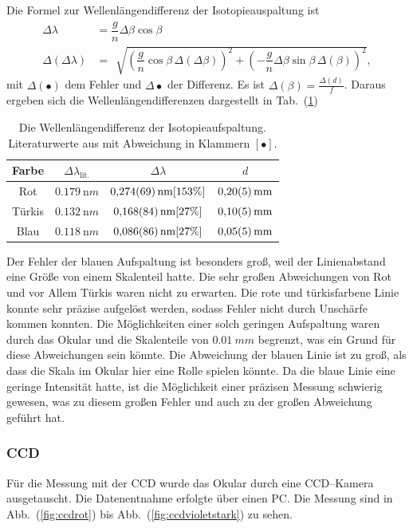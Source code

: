 \documentclass[sn-mathphys-num,iicol]{sn-jnl}
\theoremstyle{thmstyleone}
\theoremstyle{thmstyletwo}
\theoremstyle{thmstylethree}
\begin{document}
Die Formel zur Wellenlängendifferenz der Isotopieauspaltung ist
\begin{align} 
        \Delta \lambda &=\dfrac{g}{n}\Delta \beta \cos \beta\\
        \Delta \left(\Delta \lambda \right) &= \,\sqrt[]{\left(\dfrac{g}{n}\cos \beta \,\Delta \left(\Delta \beta \right)\right)^2+\left(-\dfrac{g}{n}\Delta \beta \sin \beta \,\Delta \left(\beta \right)\right)^2}
,\end{align} 
mit $\Delta \left(\bullet\right)$ dem Fehler und $\Delta \bullet $ der Differenz.
Es ist $\Delta (\beta) =\tfrac{\Delta (d)}{f}$.
Daraus ergeben sich die Wellenlängendifferenzen dargestellt in Tab.\ (\ref{tab:isotopie_okular})

\begin{table}[h]
        \begin{tabular}{cccc}
                Farbe & $\Delta \lambda _\text{lit.}$ & $\Delta \lambda $ &  $d$ \\
                \hline
                Rot & $\SI{0.179}{\nano m}$& $\SI{0.274+-0.069}{\nano m}[153\%]$  & $\SI{0.2+-0.05}{mm}$ \\
                Türkis& $\SI{0.132}{\nano m}$ & $\SI{0.168+-0.084}{\nano m}[27\%]$  & $\SI{0.1+-0.05}{mm}$ \\
                Blau & $\SI{0.118}{\nano m}$& $\SI{0.086+-0.086}{\nano m}[27\%]$  & $\SI{0.05+-0.05}{mm}$ 
        \end{tabular}
        \caption{Die Wellenlängendifferenz der Isotopieaufspaltung. Literaturwerte aus \cite{LeyboldBalmerserieBeobachtung} mit Abweichung in Klammern $[\bullet ]$.} \label{tab:isotopie_okular}
\end{table}
Der Fehler der blauen Aufspaltung ist besonders groß, weil der Linienabstand eine Größe von einem Skalenteil hatte.
Die sehr großen Abweichungen von Rot und vor Allem Türkis waren nicht zu erwarten.
Die rote und türkisfarbene Linie konnte sehr präzise aufgelöst werden, sodass Fehler nicht durch Unschärfe kommen konnten.
Die Möglichkeiten einer solch geringen Aufspaltung waren durch das Okular und die Skalenteile von $\SI{0.01}{mm}$ begrenzt, was ein Grund für diese Abweichungen sein könnte.
Die Abweichung der blauen Linie ist zu groß, als dass die Skala im Okular hier eine Rolle spielen könnte.
Da die blaue Linie eine geringe Intensität hatte, ist die Möglichkeit einer präzisen Messung schwierig gewesen, was zu diesem großen Fehler und auch zu der großen Abweichung geführt hat.

\subsubsection{CCD}
Für die Messung mit der CCD wurde das Okular durch eine CCD--Kamera ausgetauscht.
Die Datenentnahme erfolgte über einen PC.
Die Messung sind in Abb.\ (\ref{fig:ccdrot}) bis Abb.\ (\ref{fig:ccdvioletstark}) zu sehen.
\end{document}
